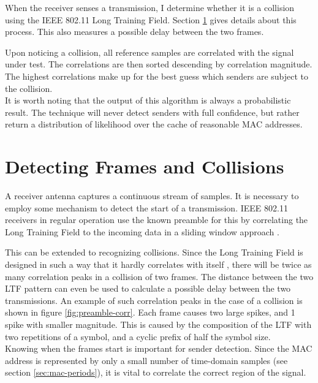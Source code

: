 When the receiver senses a transmission, I determine whether it is a collision using the IEEE 802.11 Long Training Field. Section \ref{sec:preamble-corr} gives details about this process. This also measures a possible delay between the two frames.

Upon noticing a collision, all reference samples are correlated with the signal under test. The correlations are then sorted descending by correlation magnitude. The highest correlations make up for the best guess which senders are subject to the collision.\\

It is worth noting that the output of this algorithm is always a probabilistic result. The technique will never detect senders with full confidence, but rather return a distribution of likelihood over the cache of reasonable MAC addresses.



\section{Detecting Frames and Collisions}\label{sec:preamble-corr}

A receiver antenna captures a continuous stream of samples. It is necessary to employ some mechanism to detect the start of a transmission. IEEE 802.11 receivers in regular operation use the known preamble for this by correlating the Long Training Field to the incoming data in a sliding window approach \cite{NEEDED}.

This can be extended to recognizing collisions. Since the Long Training Field is designed in such a way that it hardly correlates with itself \cite{NEEDED}, there will be twice as many correlation peaks in a collision of two frames. The distance between the two LTF pattern can even be used to calculate a possible delay between the two transmissions. An example of such correlation peaks in the case of a collision is shown in figure \ref{fig:preamble-corr}. Each frame causes two large spikes, and 1 spike with smaller magnitude. This is caused by the composition of the LTF with two repetitions of a symbol, and a cyclic prefix of half the symbol size.\\

Knowing when the frames start is important for sender detection. Since the MAC address is represented by only a small number of time-domain samples (see section \ref{sec:mac-periods}), it is vital to correlate the correct region of the signal.

